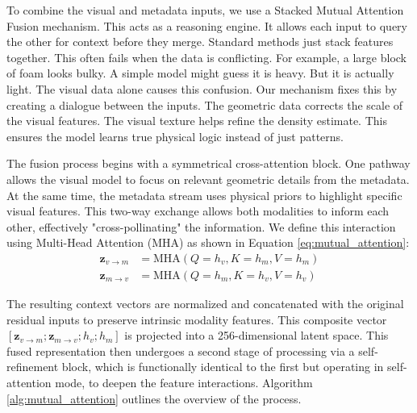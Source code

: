 \documentclass[journal,twoside,web]{ieeecolor}
\begin{document}
To combine the visual and metadata inputs, we use a Stacked Mutual Attention Fusion mechanism. This acts as a reasoning engine. It allows each input to query the other for context before they merge. Standard methods just stack features together. This often fails when the data is conflicting. For example, a large block of foam looks bulky. A simple model might guess it is heavy. But it is actually light. The visual data alone causes this confusion. Our mechanism fixes this by creating a dialogue between the inputs. The geometric data corrects the scale of the visual features. The visual texture helps refine the density estimate. This ensures the model learns true physical logic instead of just patterns.

The fusion process begins with a symmetrical cross-attention block. One pathway allows the visual model to focus on relevant geometric details from the metadata. At the same time, the metadata stream uses physical priors to highlight specific visual features. This two-way exchange allows both modalities to inform each other, effectively "cross-pollinating" the information. We define this interaction using Multi-Head Attention (MHA) as shown in Equation \eqref{eq:mutual_attention}:
\begin{equation} \label{eq:mutual_attention}
\begin{split}
    \mathbf{z}_{v \to m} &= \text{MHA}(Q=h_v, K=h_m, V=h_m) \\
    \mathbf{z}_{m \to v} &= \text{MHA}(Q=h_m, K=h_v, V=h_v)
\end{split}
\end{equation}

The resulting context vectors are normalized and concatenated with the original residual inputs to preserve intrinsic modality features. This composite vector $[ \mathbf{z}_{v \to m}; \mathbf{z}_{m \to v}; h_v; h_m ]$ is projected into a 256-dimensional latent space. This fused representation then undergoes a second stage of processing via a self-refinement block, which is functionally identical to the first but operating in self-attention mode, to deepen the feature interactions. Algorithm \ref{alg:mutual_attention} outlines the overview of the process. 
\end{document}
